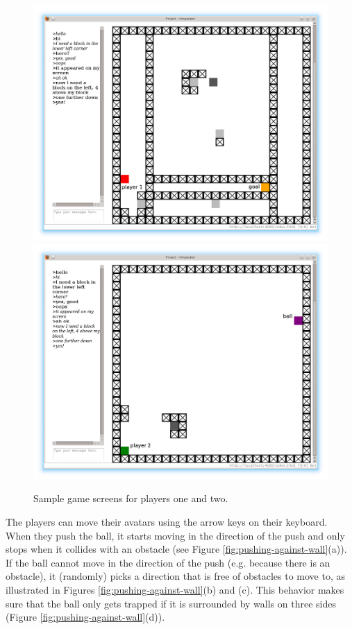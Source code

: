 \begin{figure}
\includegraphics[scale=0.25]{player1_with_label.png} 
\includegraphics[scale=0.25]{player2_with_label.png}
\caption{Sample game screens for players one and two.}
\label{fig:player-screenshots}
\end{figure}


The players can move their avatars using the arrow keys on their
keyboard. When they push the ball, it starts moving in the direction
of the push and only stops when it collides with an obstacle (see
Figure \ref{fig:pushing-against-wall}(a)). If the
ball cannot move in the direction of the push (e.g. because there is
an obstacle), it (randomly) picks a direction that is free of
obstacles to move to, as illustrated in Figures
\ref{fig:pushing-against-wall}(b) and (c). This behavior makes sure
that the ball only gets trapped if it is surrounded by walls on three
sides (Figure \ref{fig:pushing-against-wall}(d)).

